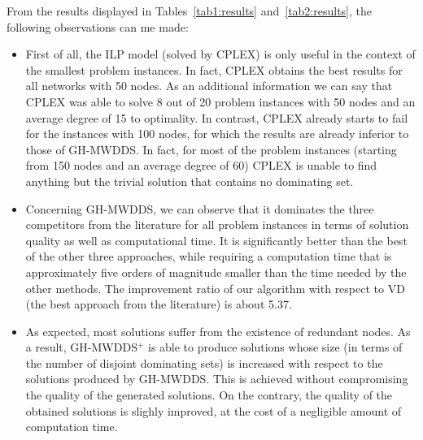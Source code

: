 \documentclass[algorithms,article,accept,moreauthors,pdftex]{Definitions/mdpi}
\begin{document}
\begin{paracol}{2}
\switchcolumn

From the results displayed in Tables~\ref{tab1:results} and~\ref{tab2:results}, the following observations can me made: 
\begin{itemize}

\item First of all, the ILP model (solved by CPLEX) is only useful in the context of the smallest problem instances. In fact, CPLEX obtains the best results for all networks with 50 nodes. As an additional information we can say that CPLEX was able to solve 8 out of 20 problem instances with 50 nodes and an average degree of 15 to optimality. In contrast, CPLEX already starts to fail for the instances with 100 nodes, for which the results are already inferior to those of GH-MWDDS. In fact, for most of the problem instances (starting from 150 nodes and an average degree of 60) CPLEX is unable to find anything but the trivial solution that contains no dominating set.

\item Concerning GH-MWDDS, we can observe that it dominates the three competitors from the literature for all problem instances in terms of solution quality as well as computational time. It is significantly better than the best of the other three approaches, while requiring a computation time that is approximately five orders of magnitude smaller than the time needed by the other methods. The improvement ratio of our algorithm with respect to VD (the best approach from the literature) is about 5.37.   

\item As expected, most solutions suffer from the existence of redundant nodes. As a result, GH-MWDDS$ ^{+}$ is able to produce solutions whose size (in terms of the number of disjoint dominating sets) is increased with respect to the solutions produced by GH-MWDDS. This is achieved without compromising the quality of the generated solutions. On the contrary, the quality of the obtained solutions is slighly improved, at the cost of a negligible amount of computation time.


\end{itemize}
\end{paracol}
\end{document}
